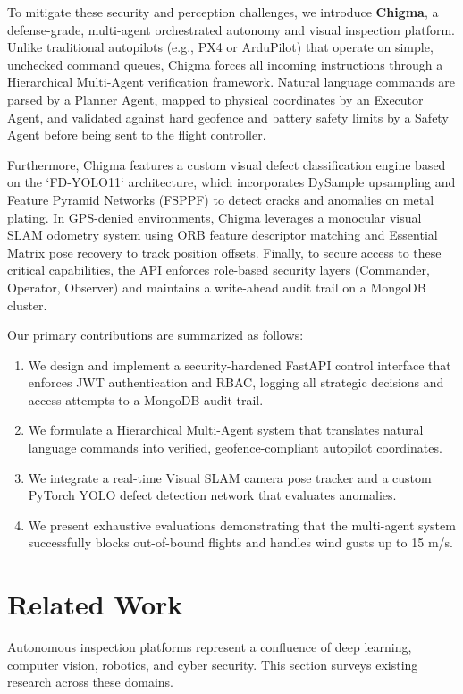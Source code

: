 \documentclass[conference]{IEEEtran}
\begin{document}
To mitigate these security and perception challenges, we introduce \textbf{Chigma}, a defense-grade, multi-agent orchestrated autonomy and visual inspection platform. Unlike traditional autopilots (e.g., PX4 or ArduPilot) that operate on simple, unchecked command queues, Chigma forces all incoming instructions through a Hierarchical Multi-Agent verification framework. Natural language commands are parsed by a Planner Agent, mapped to physical coordinates by an Executor Agent, and validated against hard geofence and battery safety limits by a Safety Agent before being sent to the flight controller.

Furthermore, Chigma features a custom visual defect classification engine based on the `FD-YOLO11` architecture, which incorporates DySample upsampling and Feature Pyramid Networks (FSPPF) to detect cracks and anomalies on metal plating. In GPS-denied environments, Chigma leverages a monocular visual SLAM odometry system using ORB feature descriptor matching and Essential Matrix pose recovery to track position offsets. Finally, to secure access to these critical capabilities, the API enforces role-based security layers (Commander, Operator, Observer) and maintains a write-ahead audit trail on a MongoDB cluster.

Our primary contributions are summarized as follows:
\begin{enumerate}
    \item We design and implement a security-hardened FastAPI control interface that enforces JWT authentication and RBAC, logging all strategic decisions and access attempts to a MongoDB audit trail.
    \item We formulate a Hierarchical Multi-Agent system that translates natural language commands into verified, geofence-compliant autopilot coordinates.
    \item We integrate a real-time Visual SLAM camera pose tracker and a custom PyTorch YOLO defect detection network that evaluates anomalies.
    \item We present exhaustive evaluations demonstrating that the multi-agent system successfully blocks out-of-bound flights and handles wind gusts up to 15 m/s.
\end{enumerate}

\section{Related Work}
Autonomous inspection platforms represent a confluence of deep learning, computer vision, robotics, and cyber security. This section surveys existing research across these domains.
\end{document}
